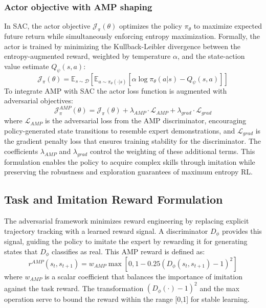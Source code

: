 \documentclass[letterpaper, 10pt, conference]{IEEEtran}
\begin{document}
\subsubsection{Actor objective with AMP shaping}
In SAC, the actor objective $\mathcal{J}_{\pi}(\theta)$ optimizes the policy $\pi_{\theta}$ to maximize expected future return while simultaneously enforcing entropy maximization. Formally, the actor is trained by minimizing the Kullback-Leibler divergence between the entropy-augmented reward, weighted by temperature $\alpha$, and the state-action value estimate $Q_{\psi}(s,a)$:
\begin{equation}
\mathcal{J}_{\pi}(\theta)=\mathbb{E}_{s\sim\mathcal{D}}[\mathbb{E}_{a\sim\pi_{\theta}(\cdot|s)}[\alpha \log \pi_{\theta}(a|s)-Q_{\psi}(s,a)]]
\end{equation}
To integrate AMP with SAC the actor loss function is augmented with adversarial objectives:
\begin{equation}
\mathcal{J}_{\pi}^{AMP}(\theta)=\mathcal{J}_{\pi}(\theta)+\lambda_{AMP}\cdot\mathcal{L}_{AMP}+\lambda_{grad}\cdot\mathcal{L}_{grad}
\end{equation}
where $\mathcal{L}_{AMP}$ is the adversarial loss from the AMP discriminator, encouraging policy-generated state transitions to resemble expert demonstrations, and $\mathcal{L}_{grad}$ is the gradient penalty loss that ensures training stability for the discriminator. The coefficients $\lambda_{AMP}$ and $\lambda_{grad}$ control the weighting of these additional terms. This formulation enables the policy to acquire complex skills through imitation while preserving the robustness and exploration guarantees of maximum entropy RL.

\subsection{Task and Imitation Reward Formulation}
The adversarial framework minimizes reward engineering by replacing explicit trajectory tracking with a learned reward signal. A discriminator $D_{\phi}$ provides this signal, guiding the policy to imitate the expert by rewarding it for generating states that $D_{\phi}$ classifies as real. This AMP reward is defined as:
\begin{equation}
r^{AMP}(s_t, s_{t+1}) = w_{AMP} \max [0, 1-0.25(D_{\phi}(s_t, s_{t+1}) - 1)^2]
\end{equation}
where $w_{AMP}$ is a scalar coefficient that balances the importance of imitation against the task reward. The transformation $(D_{\phi}(\cdot)-1)^{2}$ and the max operation serve to bound the reward within the range [0,1] for stable learning.
\end{document}
